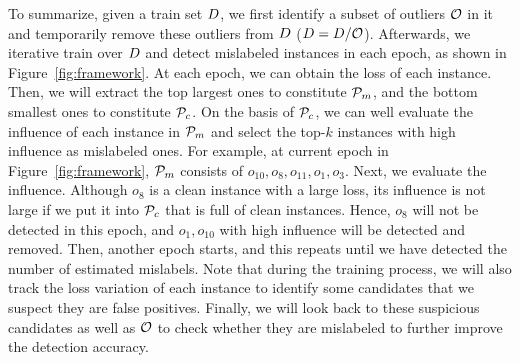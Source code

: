 
 To summarize, given a train set $D$, we first identify a subset of  outliers $\mathcal{O}$ in it and temporarily remove these outliers from $D$ (\ie $D = D/ \mathcal{O}$).
 Afterwards, we iterative train over $D$ and detect mislabeled instances in each epoch, as shown in Figure~\ref{fig:framework}. At each epoch, we can obtain the loss of each instance. Then, we will extract the top largest ones to constitute $\mathcal{P}_m$, and the bottom  smallest ones to constitute $\mathcal{P}_c$. On the basis of $\mathcal{P}_c$, we can well evaluate the influence of each instance in $\mathcal{P}_m$ and select the top-$k$ instances with high influence as mislabeled ones. For example, at current epoch in Figure~\ref{fig:framework}, $\mathcal{P}_m$ consists of $o_{10}, o_{8}, o_{11}, o_{1}, o_{3}$. Next, we evaluate the influence. Although $o_{8}$ is a clean instance with a large loss, its influence is not large if we put it into $\mathcal{P}_c$ that is full of clean instances. Hence, $o_{8}$ will not be detected in this epoch, and $o_{1},o_{10}$ with high influence will be detected and removed. Then, another epoch starts, and this repeats until we have detected the number of estimated mislabels. Note that during the training process, we will also track the loss variation of each instance to identify some candidates that we suspect they are false positives.
 Finally, we will look back to these suspicious candidates as well as  $\mathcal{O}$ to check whether they are mislabeled to further improve the detection accuracy.






